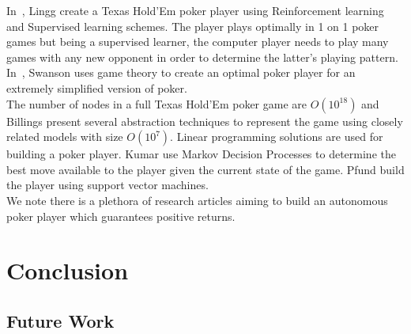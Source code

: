 \documentclass[12pt]{article}
\begin{document}
\noindent In~\cite{stanford-report}, Lingg \etal create a Texas Hold'Em poker player using Reinforcement learning and Supervised learning schemes.
The player plays optimally in 1 on 1 poker games but being a supervised learner, the computer player needs to play many games with any
new opponent in order to determine the latter's playing pattern. In~\cite{swanson2005game}, Swanson \etal uses game theory to
create an optimal poker player for an extremely simplified version of poker.\\

\noindent The number of nodes in a full Texas Hold'Em poker game are $O(10^{18})$ and Billings \etal\cite{billings2003approximating} present
several abstraction techniques to represent the game using closely related models with size $O(10^7)$. Linear programming solutions are used for
building a poker player. Kumar \etal\cite{stanford-mdp} use Markov Decision Processes to determine the best move available to the player
given the current state of the game. Pfund \etal\cite{upenn-svm} build the player using support vector machines.\\

\noindent We note there is a plethora of research articles aiming to build an autonomous poker player which guarantees positive returns.

\section{Conclusion}

\subsection{Future Work}



\end{document}
